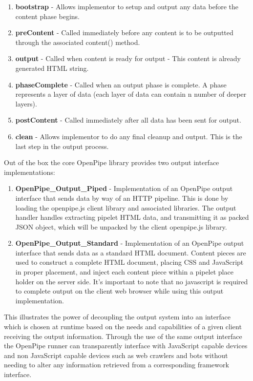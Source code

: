 \documentclass[12pt]{report}
\begin{document}
\begin{enumerate}
	\item \textbf{bootstrap} - Allows implementor to setup and output any data before the content phase begins.
	\item \textbf{preContent} - Called immediately before any content is to be outputted through the associated content() method. 
	\item \textbf{output} - Called when content is ready for output - This content is already generated HTML string.
	\item \textbf{phaseComplete} - Called when an output phase is complete. A phase represents a layer of data (each layer of data can contain n number of deeper layers).
	\item \textbf{postContent} - Called immediately after all data has been sent for output.
	\item \textbf{clean} - Allows implementor to do any final cleanup and output. This is the last step in the output process.
\end{enumerate}

Out of the box the core OpenPipe library provides two output interface implementations:

\begin{enumerate}
	\item \textbf{OpenPipe\_Output\_Piped} - Implementation of an OpenPipe output interface that sends data by way of an HTTP pipeline. This is done by loading the openpipe.js client library and associated libraries. The output handler handles extracting pipelet HTML data, and transmitting it as packed JSON object, which will be unpacked by the client openpipe.js library.
	\item \textbf{OpenPipe\_Output\_Standard} - Implementation of an OpenPipe output interface that sends data as a standard HTML document. Content pieces are used to construct a complete HTML document, placing CSS and JavaScript in proper placement, and inject each content piece within a pipelet place holder on the server side. It's important to note that no javascript is required to complete output on the client web browser while using this output implementation.
\end{enumerate}

This illustrates the power of decoupling the output system into an interface which is chosen at runtime based on the needs and capabilities of a given client receiving the output information. Through the use of the same output interface the OpenPipe runner can transparently interface with JavaScript capable devices and non JavaScript capable devices such as web crawlers and bots without needing to alter any information retrieved from a corresponding framework interface.
\end{document}
